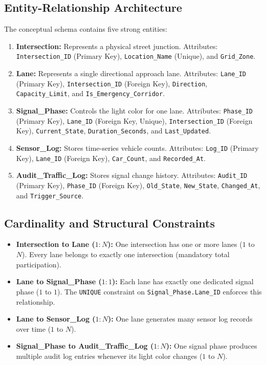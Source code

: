 \documentclass[11pt,a4paper]{article}
\begin{document}
\subsection{Entity-Relationship Architecture}
The conceptual schema contains five strong entities:
\begin{enumerate}
    \item \textbf{Intersection:} Represents a physical street junction. Attributes: \texttt{Intersection\_ID} (Primary Key), \texttt{Location\_Name} (Unique), and \texttt{Grid\_Zone}.
    \item \textbf{Lane:} Represents a single directional approach lane. Attributes: \texttt{Lane\_ID} (Primary Key), \texttt{Intersection\_ID} (Foreign Key), \texttt{Direction}, \texttt{Capacity\_Limit}, and \texttt{Is\_Emergency\_Corridor}.
    \item \textbf{Signal\_Phase:} Controls the light color for one lane. Attributes: \texttt{Phase\_ID} (Primary Key), \texttt{Lane\_ID} (Foreign Key, Unique), \texttt{Intersection\_ID} (Foreign Key), \texttt{Current\_State}, \texttt{Duration\_Seconds}, and \texttt{Last\_Updated}.
    \item \textbf{Sensor\_Log:} Stores time-series vehicle counts. Attributes: \texttt{Log\_ID} (Primary Key), \texttt{Lane\_ID} (Foreign Key), \texttt{Car\_Count}, and \texttt{Recorded\_At}.
    \item \textbf{Audit\_Traffic\_Log:} Stores signal change history. Attributes: \texttt{Audit\_ID} (Primary Key), \texttt{Phase\_ID} (Foreign Key), \texttt{Old\_State}, \texttt{New\_State}, \texttt{Changed\_At}, and \texttt{Trigger\_Source}.
\end{enumerate}

\subsection{Cardinality and Structural Constraints}
\begin{itemize}
    \item \textbf{Intersection to Lane ($1:N$):} One intersection has one or more lanes ($1$ to $N$). Every lane belongs to exactly one intersection (mandatory total participation).
    \item \textbf{Lane to Signal\_Phase ($1:1$):} Each lane has exactly one dedicated signal phase ($1$ to $1$). The \texttt{UNIQUE} constraint on \texttt{Signal\_Phase.Lane\_ID} enforces this relationship.
    \item \textbf{Lane to Sensor\_Log ($1:N$):} One lane generates many sensor log records over time ($1$ to $N$).
    \item \textbf{Signal\_Phase to Audit\_Traffic\_Log ($1:N$):} One signal phase produces multiple audit log entries whenever its light color changes ($1$ to $N$).
\end{itemize}
\end{document}
